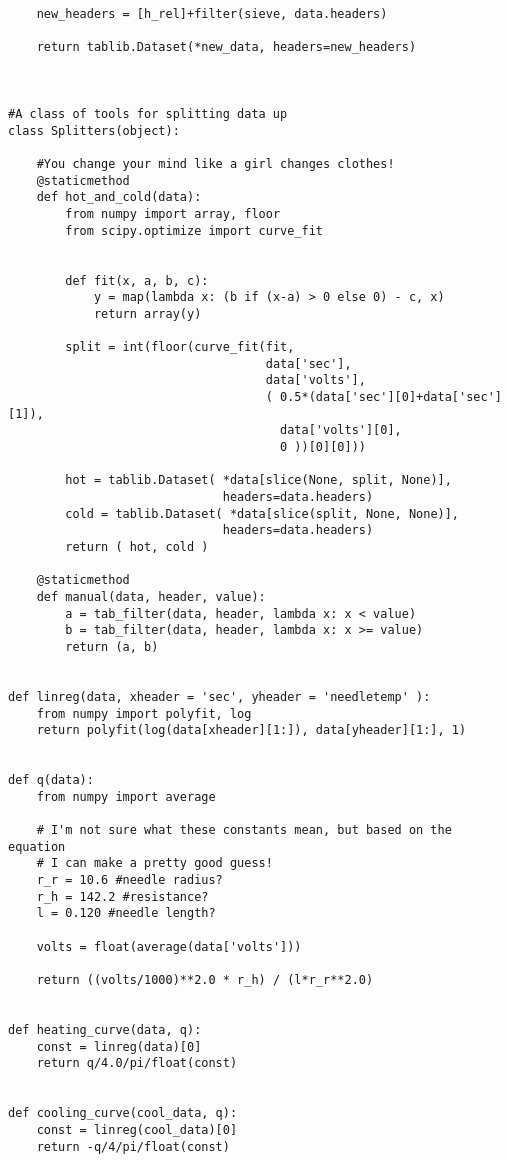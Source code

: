 \begin{verbatim}
    new_headers = [h_rel]+filter(sieve, data.headers)

    return tablib.Dataset(*new_data, headers=new_headers)



#A class of tools for splitting data up
class Splitters(object):

    #You change your mind like a girl changes clothes!
    @staticmethod
    def hot_and_cold(data):
        from numpy import array, floor
        from scipy.optimize import curve_fit
       

        def fit(x, a, b, c):
            y = map(lambda x: (b if (x-a) > 0 else 0) - c, x)
            return array(y)

        split = int(floor(curve_fit(fit,
                                    data['sec'],
                                    data['volts'],
                                    ( 0.5*(data['sec'][0]+data['sec'][1]),
                                      data['volts'][0],
                                      0 ))[0][0]))

        hot = tablib.Dataset( *data[slice(None, split, None)], 
                              headers=data.headers)
        cold = tablib.Dataset( *data[slice(split, None, None)],
                              headers=data.headers)
        return ( hot, cold )

    @staticmethod
    def manual(data, header, value):
        a = tab_filter(data, header, lambda x: x < value)
        b = tab_filter(data, header, lambda x: x >= value)
        return (a, b)


def linreg(data, xheader = 'sec', yheader = 'needletemp' ):
    from numpy import polyfit, log
    return polyfit(log(data[xheader][1:]), data[yheader][1:], 1)


def q(data):
    from numpy import average

    # I'm not sure what these constants mean, but based on the equation
    # I can make a pretty good guess!
    r_r = 10.6 #needle radius?
    r_h = 142.2 #resistance?
    l = 0.120 #needle length?

    volts = float(average(data['volts']))

    return ((volts/1000)**2.0 * r_h) / (l*r_r**2.0)


def heating_curve(data, q):
    const = linreg(data)[0]
    return q/4.0/pi/float(const)


def cooling_curve(cool_data, q):
    const = linreg(cool_data)[0]
    return -q/4/pi/float(const)



\end{verbatim}
